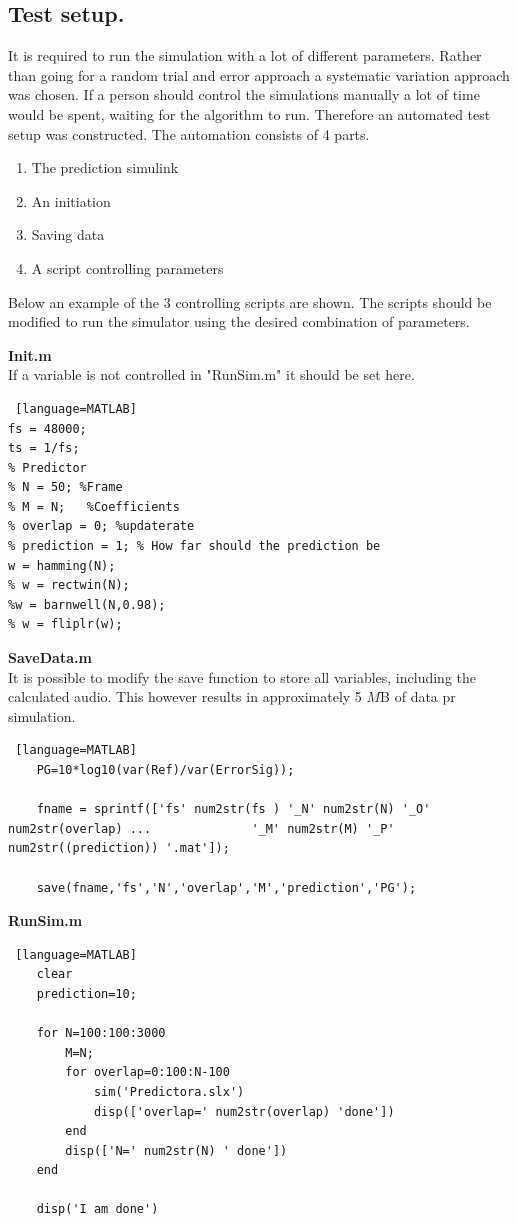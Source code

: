 \subsection{Test setup.}
It is required to run the simulation with a lot of different parameters. Rather than going for a random trial and error approach a systematic variation approach was chosen. If a person should control the simulations manually a lot of time would be spent, waiting for the algorithm to run. Therefore an automated test setup was constructed. The automation consists of 4 parts. 
\begin{enumerate}
	\item The prediction simulink
	\item An initiation 
	\item Saving data
	\item A script controlling parameters 
\end{enumerate}  

Below an example of the 3 controlling scripts are shown. The  scripts should be modified to run the simulator using the desired combination of parameters.

\textbf{Init.m}\\
If a variable is not controlled in "RunSim.m" it should be set here. 
\begin{lstlisting} [language=MATLAB]
fs = 48000;
ts = 1/fs; 
% Predictor 
% N = 50; %Frame
% M = N;   %Coefficients
% overlap = 0; %updaterate
% prediction = 1; % How far should the prediction be
w = hamming(N); 
% w = rectwin(N);
%w = barnwell(N,0.98);
% w = fliplr(w);
\end{lstlisting}

\textbf{SaveData.m}\\
It is possible to modify the save function to store all variables, including the calculated audio. This however results in approximately 5 $M$B of data pr simulation.  
\begin{lstlisting} [language=MATLAB]
	PG=10*log10(var(Ref)/var(ErrorSig));
	
	fname = sprintf(['fs' num2str(fs ) '_N' num2str(N) '_O' num2str(overlap) ...              '_M' num2str(M) '_P' num2str((prediction)) '.mat']);
	
	save(fname,'fs','N','overlap','M','prediction','PG');
\end{lstlisting}

\textbf{RunSim.m}
\begin{lstlisting} [language=MATLAB]
	clear 
	prediction=10;
	
	for N=100:100:3000
		M=N;
		for overlap=0:100:N-100
			sim('Predictora.slx')
			disp(['overlap=' num2str(overlap) 'done'])
		end
		disp(['N=' num2str(N) ' done'])
	end
	
	disp('I am done')	
\end{lstlisting}


